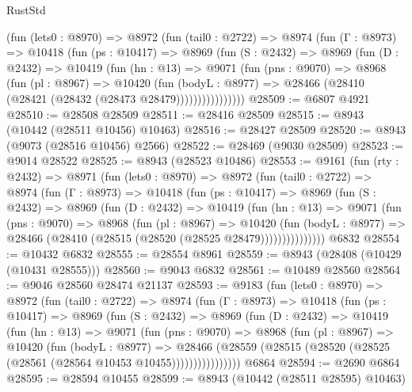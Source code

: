 \begin{lexlean}{RustStd}
\begin{coremodule}
{\begin{coremodule}
{{{{{{{{{{{{{{{{{{{{{{{{{{{{{{{{{{{{{{{        (fun (lets0 : @8970) =>
        @8972
          (fun (tail0 : @2722) =>
          @8974
            (fun (Γ : @8973) =>
            @10418
              (fun (ps : @10417) =>
              @8969
                (fun (S : @2432) =>
                @8969
                  (fun (D : @2432) =>
                  @10419
                    (fun (hn : @13) =>
                    @9071
                      (fun (pns : @9070) =>
                      @8968
                        (fun (pl : @8967) =>
                        @10420
                          (fun (bodyL : @8977) =>
                          @28466 (@28410 (@28421 (@28432 (@28473 @28479))))))))))))))))
@28509 := @6807 @4921
@28510 := @28508 @28509
@28511 := @28416 @28509
@28515 := @8943 (@10442 (@28511 @10456) @10463)
@28516 := @28427 @28509
@28520 := @8943 (@9073 (@28516 @10456) @2566)
@28522 := @28469 (@9030 @28509)
@28523 := @9014 @28522
@28525 := @8943 (@28523 @10486)
@28553 := @9161
    (fun (rty : @2432) =>
    @8971
      (fun (lets0 : @8970) =>
      @8972
        (fun (tail0 : @2722) =>
        @8974
          (fun (Γ : @8973) =>
          @10418
            (fun (ps : @10417) =>
            @8969
              (fun (S : @2432) =>
              @8969
                (fun (D : @2432) =>
                @10419
                  (fun (hn : @13) =>
                  @9071
                    (fun (pns : @9070) =>
                    @8968
                      (fun (pl : @8967) =>
                      @10420
                        (fun (bodyL : @8977) =>
                        @28466 (@28410 (@28515 (@28520 (@28525 @28479)))))))))))))))
    @6832
@28554 := @10432 @6832
@28555 := @28554 @8961
@28559 := @8943 (@28408 (@10429 (@10431 @28555)))
@28560 := @9043 @6832
@28561 := @10489 @28560
@28564 := @9046 @28560 @28474 @21137
@28593 := @9183
    (fun (lets0 : @8970) =>
    @8972
      (fun (tail0 : @2722) =>
      @8974
        (fun (Γ : @8973) =>
        @10418
          (fun (ps : @10417) =>
          @8969
            (fun (S : @2432) =>
            @8969
              (fun (D : @2432) =>
              @10419
                (fun (hn : @13) =>
                @9071
                  (fun (pns : @9070) =>
                  @8968
                    (fun (pl : @8967) =>
                    @10420
                      (fun (bodyL : @8977) =>
                      @28466
                        (@28559
                          (@28515 (@28520 (@28525 (@28561 (@28564 @10453 @10455))))))))))))))))
    @6864
@28594 := @2690 @6864
@28595 := @28594 @10455
@28599 := @8943 (@10442 (@28511 @28595) @10463)
}}}}}}}}}}}}}}}}}}}}}}}}}}}}}}}}}}}}}}}
\end{coremodule}}
\end{coremodule}
\end{lexlean}
